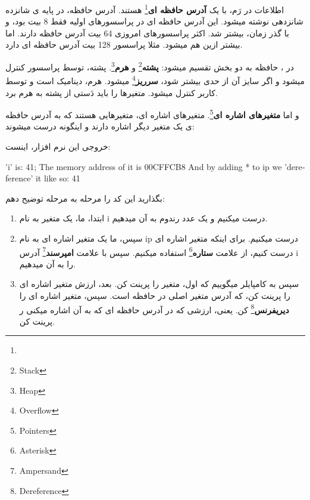 \documentclass[14pt,a4paper]{memoir}
\begin{document}
  اطلاعات در رَم، با یک \textbf{آدرس حافظه ای}\footnote{} هستند. آدرس حافظه، در پایه ی شانزده شانزدهی نوشته میشود. این آدرس حافظه ای در پراسسورهای اولیه فقط 8 بیت بود، و با گذر زمان، بیشتر شد. اکثر پراسسورهای امروزی 64 بیت آدرس حافظه دارند. اما بیشتر ازین هم میشود. مثلا پراسسور  128 بیت آدرس حافظه ای دارد.
  
  در ، حافظه به دو بخش تقسیم میشود: \textbf{پشته}\footnote{Stack} و \textbf{هرم}\footnote{Heap}. پشته، توسط پراسسور کنترل میشود و اگر سایز آن از حدی بیشتر شود، \textbf{سرریز}\footnote{Overflow} میشود. هرم، دینامیک است و توسط کاربر کنترل میشود. متغیرها را باید دَستی از پشته به هرم برد.
  
  و اما \textbf{متغیرهای اشاره ای}\footnote{Pointers}. متغیرهای اشاره ای، متغیرهایی هستند که به آدرس حافظه ی یک متغیر دیگر اشاره دارند و اینگونه درست میشوند: 
	 
	 
	 
	 \begin{latin}
	 	
	 \end{latin}
	 
	 
خروجی این نرم افزار، اینست:


	\begin{latin}
		\mono
		\color{blue}
'i' is: 41; The memory address of it is 00CFFCB8
And by adding * to ip we 'dereference' it like so: 41
	\end{latin}
	

	 بگذارید این کد را مرحله به مرحله توضیح دهم:
	 \begin{enumerate}
	 	\item  ابتدا، ما،  یک متغیر به نام i درست میکنیم و یک عدد رندوم به آن میدهیم.
	 	\item  سپس، ما یک متغیر اشاره ای به نام ip درست میکنیم. برای اینکه متغیر اشاره ای درست کنیم، از علامت \textbf{ستاره}\footnote{Asterisk} استفاده میکنیم. سپس با علامت \textbf{امپرسند}\footnote{Ampersand} آدرس i را به آن میدهیم.
	 	\item سپس به کامپایلر میگوییم که اول، متغیر را پرینت کن. بعد، ارزش متغیر اشاره ای را پرینت کن، که آدرس متغیر اصلی در حافظه است. سپس، متغیر اشاره ای را \textbf{دیریفرنس}\footnote{Dereference} کن. یعنی، ارزشی که در آدرس حافظه ای که به آن اشاره میکنی ر پرینت کن.
	 \end{enumerate}
 
\end{document}
